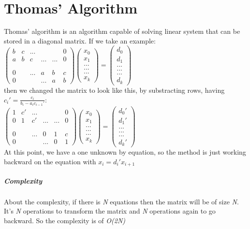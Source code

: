 \documentclass[12pt, a4paper]{report}
\begin{document}
\chapter{Thomas' Algorithm}
Thomas' algorithm is an algorithm capable of solving linear system that can be stored in a diagonal matrix.
If we take an example: \\$\begin{pmatrix}
b & c & ... &&& 0\\
a & b & c & ...&... & 0\\
&&&&&\\
&&&&&\\
 0 & &...& a&b & c \\
0 &  &&...& a & b
\end{pmatrix}
\begin{pmatrix}
x_{0}\\
x_{1}\\
...\\
...\\
...\\
x_{k}
\end{pmatrix}
=
\begin{pmatrix}
d_{0}\\
d_{1}\\
...\\
...\\
...\\
d_{k}
\end{pmatrix}$\\
then we changed the matrix to look like this, by substracting rows, having $c_{i}' = \frac{c_{i}}{b_{i}-a_{i}c_{i-1}'}$: \\$\begin{pmatrix}
1 & c' & ... &&& 0\\
0 & 1 & c' & ...&... & 0\\
&&&&&\\
&&&&&\\
 0 & &...& 0&1 & c \\
0 &  &&...& 0 & 1
\end{pmatrix}
\begin{pmatrix}
x_{0}\\
x_{1}\\
...\\
...\\
...\\
x_{k}
\end{pmatrix}
=
\begin{pmatrix}
d_{0}'\\
d_{1}'\\
...\\
...\\
...\\
d_{k}'
\end{pmatrix}$\\
At this point, we have a one unknown by equation, so the method is just working backward on the equation with $x_{i} = d_{i}'x_{i+1}$\\
\paragraph{Complexity}About the complexity, if there is \textit{N} equations then the matrix will be of size \textit{N}. It's \textit{N} operations to transform the matrix and \textit{N} operations again to go backward. So the complexity is of \textit{O(2N)} 
\end{document}
